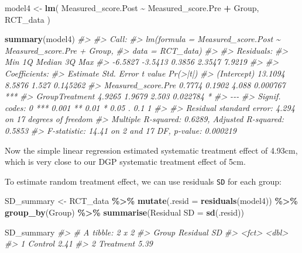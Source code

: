 \documentclass[
]{book}
\newenvironment{Shaded}{\begin{snugshade}}{\end{snugshade}}
\newcommand{\CommentTok}[1]{\textcolor[rgb]{0.56,0.35,0.01}{\textit{#1}}}
\newcommand{\DataTypeTok}[1]{\textcolor[rgb]{0.13,0.29,0.53}{#1}}
\newcommand{\KeywordTok}[1]{\textcolor[rgb]{0.13,0.29,0.53}{\textbf{#1}}}
\newcommand{\NormalTok}[1]{#1}
\newcommand{\OperatorTok}[1]{\textcolor[rgb]{0.81,0.36,0.00}{\textbf{#1}}}
\newcommand{\StringTok}[1]{\textcolor[rgb]{0.31,0.60,0.02}{#1}}
\begin{document}
\begin{Shaded}
\begin{Highlighting}[]
\NormalTok{model4 <{-}}\StringTok{ }\KeywordTok{lm}\NormalTok{(}
\NormalTok{  Measured\_score.Post }\OperatorTok{\textasciitilde{}}\StringTok{ }\NormalTok{Measured\_score.Pre }\OperatorTok{+}\StringTok{ }\NormalTok{Group,}
\NormalTok{  RCT\_data}
\NormalTok{)}

\KeywordTok{summary}\NormalTok{(model4)}
\CommentTok{\#> }
\CommentTok{\#> Call:}
\CommentTok{\#> lm(formula = Measured\_score.Post \textasciitilde{} Measured\_score.Pre + Group, }
\CommentTok{\#>     data = RCT\_data)}
\CommentTok{\#> }
\CommentTok{\#> Residuals:}
\CommentTok{\#>     Min      1Q  Median      3Q     Max }
\CommentTok{\#> {-}6.5827 {-}3.5413  0.3856  2.3547  7.9219 }
\CommentTok{\#> }
\CommentTok{\#> Coefficients:}
\CommentTok{\#>                    Estimate Std. Error t value Pr(>|t|)    }
\CommentTok{\#> (Intercept)         13.1094     8.5876   1.527 0.145262    }
\CommentTok{\#> Measured\_score.Pre   0.7774     0.1902   4.088 0.000767 ***}
\CommentTok{\#> GroupTreatment       4.9265     1.9679   2.503 0.022784 *  }
\CommentTok{\#> {-}{-}{-}}
\CommentTok{\#> Signif. codes:  0 \textquotesingle{}***\textquotesingle{} 0.001 \textquotesingle{}**\textquotesingle{} 0.01 \textquotesingle{}*\textquotesingle{} 0.05 \textquotesingle{}.\textquotesingle{} 0.1 \textquotesingle{} \textquotesingle{} 1}
\CommentTok{\#> }
\CommentTok{\#> Residual standard error: 4.294 on 17 degrees of freedom}
\CommentTok{\#> Multiple R{-}squared:  0.6289,	Adjusted R{-}squared:  0.5853 }
\CommentTok{\#> F{-}statistic: 14.41 on 2 and 17 DF,  p{-}value: 0.000219}
\end{Highlighting}
\end{Shaded}

Now the simple linear regression estimated systematic treatment effect of 4.93cm, which is very close to our DGP systematic treatment effect of 5cm.

To estimate random treatment effect, we can use residuals \texttt{SD} for each group:

\begin{Shaded}
\begin{Highlighting}[]
\NormalTok{SD\_summary <{-}}\StringTok{ }\NormalTok{RCT\_data }\OperatorTok{\%>\%}
\StringTok{  }\KeywordTok{mutate}\NormalTok{(}\DataTypeTok{.resid =} \KeywordTok{residuals}\NormalTok{(model4)) }\OperatorTok{\%>\%}
\StringTok{  }\KeywordTok{group\_by}\NormalTok{(Group) }\OperatorTok{\%>\%}
\StringTok{  }\KeywordTok{summarise}\NormalTok{(}\StringTok{\textasciigrave{}}\DataTypeTok{Residual SD}\StringTok{\textasciigrave{}}\NormalTok{ =}\StringTok{ }\KeywordTok{sd}\NormalTok{(.resid))}

\NormalTok{SD\_summary}
\CommentTok{\#> \# A tibble: 2 x 2}
\CommentTok{\#>   Group     \textasciigrave{}Residual SD\textasciigrave{}}
\CommentTok{\#>   <fct>             <dbl>}
\CommentTok{\#> 1 Control            2.41}
\CommentTok{\#> 2 Treatment          5.39}
\end{Highlighting}
\end{Shaded}
\end{document}

